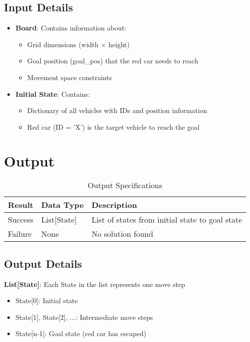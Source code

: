 \documentclass[12pt,a4paper]{article}
\begin{document}
\subsection{Input Details}
\begin{itemize}
    \item \textbf{Board}: Contains information about:
    \begin{itemize}
        \item Grid dimensions (width $\times$ height)
        \item Goal position (goal\_pos) that the red car needs to reach
        \item Movement space constraints
    \end{itemize}
    
    \item \textbf{Initial State}: Contains:
    \begin{itemize}
        \item Dictionary of all vehicles with IDs and position information
        \item Red car (ID = 'X') is the target vehicle to reach the goal
    \end{itemize}
\end{itemize}

\section{Output}

\begin{table}[h!]
\centering
\begin{tabular}{|l|l|p{6cm}|}
\hline
\textbf{Result} & \textbf{Data Type} & \textbf{Description} \\
\hline
Success & List[State] & List of states from initial state to goal state \\
\hline
Failure & None & No solution found \\
\hline
\end{tabular}
\caption{Output Specifications}
\end{table}

\subsection{Output Details}
\textbf{List[State]}: Each State in the list represents one move step
\begin{itemize}
    \item State[0]: Initial state
    \item State[1], State[2], ...: Intermediate move steps
    \item State[n-1]: Goal state (red car has escaped)
\end{itemize}
\end{document}
